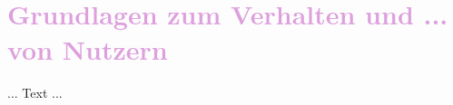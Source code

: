 \section{\textcolor{Plum}{Grundlagen zum Verhalten und ... von Nutzern}}
\label{ch:SdF:Psych}

... Text ... \cite{Wickens:2013}